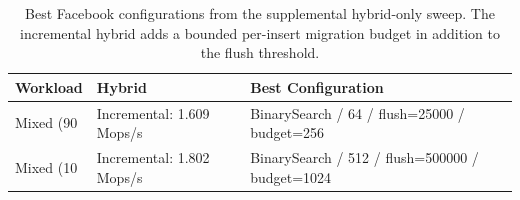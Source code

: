 \begin{table}[h]
\centering
\scriptsize
\setlength{\tabcolsep}{4pt}
\begin{tabular}{p{2.2in}p{1.0in}p{2.2in}}
\toprule
Workload & Hybrid & Best Configuration \\
\midrule
Mixed (90%
 & Incremental: 1.609 Mops/s & BinarySearch / 64 / flush=25000 / budget=256 \\
\addlinespace
Mixed (10%
 & Incremental: 1.802 Mops/s & BinarySearch / 512 / flush=500000 / budget=1024 \\
\bottomrule
\end{tabular}
\caption{Best Facebook configurations from the supplemental hybrid-only sweep. The incremental hybrid adds a bounded per-insert migration budget in addition to the flush threshold.}
\end{table}
